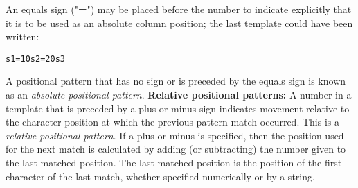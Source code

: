 An equals sign ("\textbf{=}") may be placed before the number
to indicate explicitly that it is to be used as an absolute column
position; the last template could have been written:
\begin{alltt}
s1 =10 s2 =20 s3
\end{alltt}
 A positional pattern that has no sign or is preceded by the
equals sign is known as an \emph{absolute positional pattern}.
 \textbf{Relative positional patterns:}
A number in a template that is preceded by a plus or minus sign
indicates
movement relative to the character position at which the previous
pattern match occurred.
This is a \emph{relative positional pattern}.
 If a plus or minus
is specified, then the position used for the next
match is calculated by adding (or subtracting) the number given to the
last matched position.
The last matched position is the position of the first character of the
last match, whether specified numerically or by a string.
 
